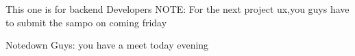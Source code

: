 This one is for backend Developers
NOTE:
For the next project ux,you guys have to submit the sampo on coming friday

Notedown Guys:
you have a meet today evening